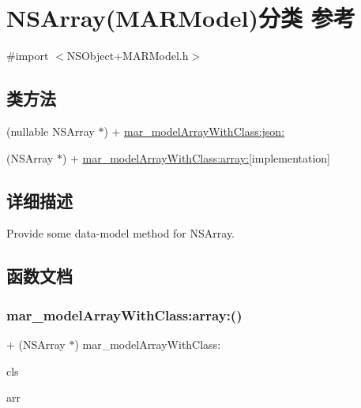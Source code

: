 \hypertarget{category_n_s_array_07_m_a_r_model_08}{}\section{N\+S\+Array(M\+A\+R\+Model)分类 参考}
\label{category_n_s_array_07_m_a_r_model_08}


{\ttfamily \#import $<$N\+S\+Object+\+M\+A\+R\+Model.\+h$>$}

\subsection*{类方法}
\begin{DoxyCompactItemize}
\item 
(nullable N\+S\+Array $\ast$) + \hyperlink{category_n_s_array_07_m_a_r_model_08_a0fe4a7681c640cbec42b0c0304c8f240}{mar\+\_\+model\+Array\+With\+Class\+:json\+:}
\item 
(N\+S\+Array $\ast$) + \hyperlink{category_n_s_array_07_m_a_r_model_08_ab0c753c0020db00f3328f34f2b3faa99}{mar\+\_\+model\+Array\+With\+Class\+:array\+:}{\ttfamily  \mbox{[}implementation\mbox{]}}
\end{DoxyCompactItemize}


\subsection{详细描述}
Provide some data-\/model method for N\+S\+Array. 

\subsection{函数文档}
\mbox{\label{category_n_s_array_07_m_a_r_model_08_ab0c753c0020db00f3328f34f2b3faa99}} 
\subsubsection{\texorpdfstring{mar\+\_\+model\+Array\+With\+Class\+:array\+:()}{mar\_modelArrayWithClass:array:()}}
{\footnotesize\ttfamily + (N\+S\+Array $\ast$) mar\+\_\+model\+Array\+With\+Class\+: \begin{DoxyParamCaption}\item[{(Class)}]{cls }\item[{array:(N\+S\+Array $\ast$)}]{arr }\end{DoxyParamCaption}\hspace{0.3cm}{\ttfamily [implementation]}}

